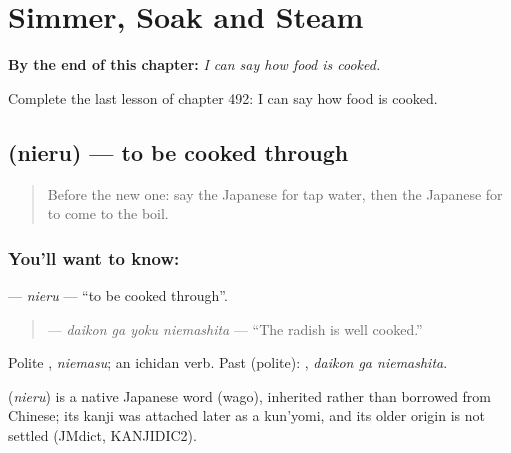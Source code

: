 
\chapter{Simmer, Soak and Steam}
\label{ch:ja-simmer-soak-and-steam}

\begin{chapteropening}
\textbf{By the end of this chapter:} \emph{I can say how food is cooked.}

Complete the last lesson of chapter 492: I can say how food is cooked.
\end{chapteropening}

\section[\texorpdfstring{\ja{にえる} (nieru)}{にえる (nieru)}]{ (nieru) — to be cooked through}

\label{lesson:JA-C492-nieru}



\begin{quote}
Before the new one: say the Japanese for tap water, then the Japanese for to come to the boil.
\end{quote}

\subsection*{You'll want to know: }
\textbf{} — \emph{nieru} — \textquotedblleft{}to be cooked through\textquotedblright{}.

\begin{quote}
\textbf{  } — \emph{daikon ga yoku niemashita} — \textquotedblleft{}The radish is well cooked.\textquotedblright{}
\end{quote}

Polite \textbf{}, \emph{niemasu}; an ichidan verb. Past (polite): \textbf{ }, \emph{daikon ga niemashita}.

\begin{cousinweb}
\textbf{} (\emph{nieru}) is a native Japanese word (wago), inherited rather than borrowed from Chinese; its kanji was attached later as a kun'yomi, and its older origin is not settled (JMdict, KANJIDIC2).
\end{cousinweb}

